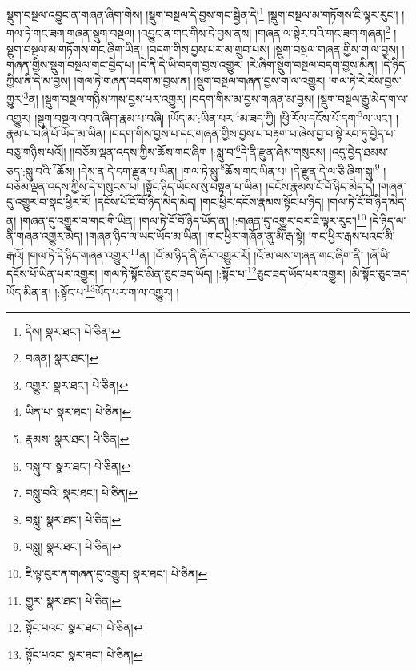 སྡུག་བསྔལ་འབྱུང་ན་གཞན་ཞིག་གིས། །སྡུག་བསྔལ་དེ་བྱས་གང་སྦྱིན་དེ།\footnote{དེས།  སྣར་ཐང་།  པེ་ཅིན། } །སྡུག་བསྔལ་མ་གཏོགས་ཇི་ལྟར་རུང་། །གལ་ཏེ་གང་ཟག་གཞན་སྡུག་བསྔལ། །འབྱུང་ན་གང་གིས་དེ་བྱས་ནས། །གཞན་ལ་སྟེར་བའི་གང་ཟག་གཞན།\footnote{བཞན།  སྣར་ཐང་། } །སྡུག་བསྔལ་མ་གཏོགས་གང་ཞིག་ཡིན། །བདག་གིས་བྱས་པར་མ་གྲུབ་པས། །སྡུག་བསྔལ་གཞན་གྱིས་ག་ལ་བྱས། །གཞན་གྱིས་སྡུག་བསྔལ་གང་བྱེད་པ། །དེ་ནི་དེ་ཡི་བདག་བྱས་འགྱུར། །རེ་ཞིག་སྡུག་བསྔལ་བདག་བྱས་མིན། །དེ་ཉིད་ཀྱིས་ནི་དེ་མ་བྱས། །གལ་ཏེ་གཞན་བདག་མ་བྱས་ན། །སྡུག་བསྔལ་གཞན་བྱས་ག་ལ་འགྱུར། །གལ་ཏེ་རེ་རེས་བྱས་གྱུར་\footnote{འགྱུར་  སྣར་ཐང་།  པེ་ཅིན། }ན། །སྡུག་བསྔལ་གཉིས་ཀས་བྱས་པར་འགྱུར། །བདག་གིས་མ་བྱས་གཞན་མ་བྱས། །སྡུག་བསྔལ་རྒྱུ་མེད་ག་ལ་འགྱུར། །སྡུག་བསྔལ་འབའ་ཞིག་རྣམ་པ་བཞི། །ཡོད་མ་:ཡིན་པར་\footnote{ཡིན་པ་  སྣར་ཐང་།  པེ་ཅིན། }མ་ཟད་ཀྱི། །ཕྱི་རོལ་དངོས་པོ་དག་\footnote{རྣམས་  སྣར་ཐང་།  པེ་ཅིན། }ལ་ཡང་། །རྣམ་པ་བཞི་པོ་ཡོད་མ་ཡིན། །བདག་གིས་བྱས་པ་དང་གཞན་གྱིས་བྱས་པ་བརྟག་པ་ཞེས་བྱ་བ་སྟེ་རབ་ཏུ་བྱེད་པ་བཅུ་གཉིས་པའོ།། །།བཅོམ་ལྡན་འདས་ཀྱིས་ཆོས་གང་ཞིག །:སླུ་བ་\footnote{བསླུ་བ་  སྣར་ཐང་།  པེ་ཅིན། }དེ་ནི་རྫུན་ཞེས་གསུངས། །འདུ་བྱེད་ཐམས་ཅད་:སླུ་བའི་\footnote{བསླུ་བའི་  སྣར་ཐང་།  པེ་ཅིན། }ཆོས། །དེས་ན་དེ་དག་རྫུན་པ་ཡིན། །གལ་ཏེ་སླུ་\footnote{བསླུ་  སྣར་ཐང་།  པེ་ཅིན། }ཆོས་གང་ཡིན་པ། །དེ་རྫུན་དེ་ལ་ཅི་ཞིག་སླུ།\footnote{བསླུ།  སྣར་ཐང་།  པེ་ཅིན། } །བཅོམ་ལྡན་འདས་ཀྱིས་དེ་གསུངས་པ། །སྟོང་ཉིད་ཡོངས་སུ་བསྟན་པ་ཡིན། །དངོས་རྣམས་ངོ་བོ་ཉིད་མེད་དེ། །གཞན་དུ་འགྱུར་བ་སྣང་ཕྱིར་རོ། །དངོས་པོ་ངོ་བོ་ཉིད་མེད་མེད། །གང་ཕྱིར་དངོས་རྣམས་སྟོང་པ་ཉིད། །གལ་ཏེ་ངོ་བོ་ཉིད་མེད་ན། །གཞན་དུ་འགྱུར་བ་གང་གི་ཡིན། །གལ་ཏེ་ངོ་བོ་ཉིད་ཡོད་ན། །:གཞན་དུ་འགྱུར་བར་ཇི་ལྟར་རུང་།\footnote{ཇི་ལྟ་བུར་ན་གཞན་དུ་འགྱུར།  སྣར་ཐང་།  པེ་ཅིན། } །དེ་ཉིད་ལ་ནི་གཞན་འགྱུར་མེད། །གཞན་ཉིད་ལ་ཡང་ཡོད་མ་ཡིན། །གང་ཕྱིར་གཞོན་ནུ་མི་རྒ་སྟེ། །གང་ཕྱིར་རྒས་པའང་མི་རྒའོ། །གལ་ཏེ་དེ་ཉིད་གཞན་འགྱུར་\footnote{གྱུར་  སྣར་ཐང་།  པེ་ཅིན། }ན། །འོ་མ་ཉིད་ནི་ཞོར་འགྱུར་རོ། །འོ་མ་ལས་གཞན་གང་ཞིག་ནི། །ཞོ་ཡི་དངོས་པོ་ཡིན་པར་འགྱུར། །གལ་ཏེ་སྟོང་མིན་ཅུང་ཟད་ཡོད། །:སྟོང་པ་\footnote{སྟོང་པའང་  སྣར་ཐང་།  པེ་ཅིན། }ཅུང་ཟད་ཡོད་པར་འགྱུར། །མི་སྟོང་ཅུང་ཟད་ཡོད་མིན་ན། །:སྟོང་པ་\footnote{སྟོང་པའང་  སྣར་ཐང་།  པེ་ཅིན། }ཡོད་པར་ག་ལ་འགྱུར། །
